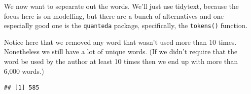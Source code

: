 \documentclass[
]{book}
\newenvironment{Shaded}{\begin{snugshade}}{\end{snugshade}}
\newcommand{\DataTypeTok}[1]{\textcolor[rgb]{0.13,0.29,0.53}{#1}}
\newcommand{\DecValTok}[1]{\textcolor[rgb]{0.00,0.00,0.81}{#1}}
\newcommand{\KeywordTok}[1]{\textcolor[rgb]{0.13,0.29,0.53}{\textbf{#1}}}
\newcommand{\NormalTok}[1]{#1}
\newcommand{\OperatorTok}[1]{\textcolor[rgb]{0.81,0.36,0.00}{\textbf{#1}}}
\newcommand{\StringTok}[1]{\textcolor[rgb]{0.31,0.60,0.02}{#1}}
\begin{document}
\begin{Shaded}
\end{Shaded}

We now want to sepearate out the words. We'll just use tidytext, because the focus here is on modelling, but there are a bunch of alternatives and one especially good one is the \texttt{quanteda} package, specifically, the \texttt{tokens()} function.

\begin{Shaded}
\end{Shaded}

Notice here that we removed any word that wasn't used more than 10 times. Nonetheless we still have a lot of unique words. (If we didn't require that the word be used by the author at least 10 times then we end up with more than 6,000 words.)

\begin{Shaded}
\end{Shaded}

\begin{verbatim}
## [1] 585
\end{verbatim}
\end{document}
